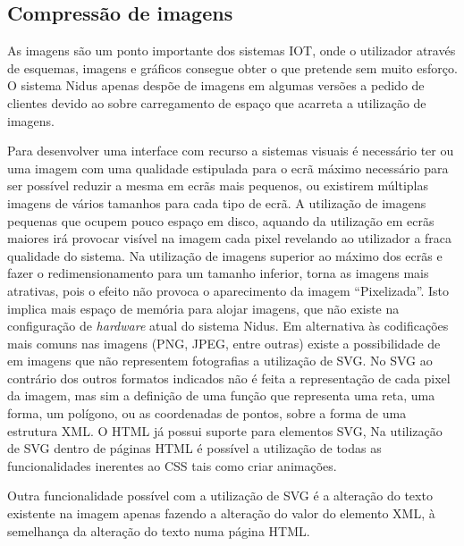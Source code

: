 \subsection{Compressão de imagens}\label{compressimaage}

\par As imagens são um ponto importante dos sistemas IOT, onde o utilizador através de esquemas, imagens e gráficos consegue obter o que pretende sem muito esforço. O sistema Nidus apenas despõe de imagens em algumas versões a pedido de clientes devido ao sobre carregamento de espaço que acarreta a utilização de imagens.
\par Para desenvolver uma interface com recurso a sistemas visuais é necessário ter ou uma imagem com uma qualidade estipulada para o ecrã máximo necessário para ser possível reduzir a mesma em ecrãs mais pequenos, ou existirem múltiplas imagens de vários tamanhos para cada tipo de ecrã. A utilização de imagens pequenas que ocupem pouco espaço em disco, aquando da utilização em ecrãs maiores irá provocar visível na imagem cada pixel revelando ao utilizador a fraca qualidade do sistema. Na utilização de imagens superior ao máximo dos ecrãs e fazer o redimensionamento para um tamanho inferior, torna as imagens mais atrativas, pois o efeito não provoca o aparecimento da imagem “Pixelizada”. Isto implica mais espaço de memória para alojar imagens, que não existe na configuração de \textit{hardware} atual do sistema Nidus. Em alternativa às codificações mais comuns nas imagens (PNG, JPEG, entre outras) existe a possibilidade de em imagens que não representem fotografias a utilização de SVG. No SVG ao contrário dos outros formatos indicados não é feita a representação de cada pixel da imagem, mas sim a definição de uma função que representa uma reta, uma forma, um polígono, ou as coordenadas de pontos, sobre a forma de uma estrutura XML. O HTML já possui suporte  para elementos SVG, Na utilização de SVG dentro de páginas HTML é possível a utilização de todas as funcionalidades inerentes ao CSS tais como criar animações. 
\par Outra funcionalidade possível com a utilização de SVG é a alteração do texto existente na imagem apenas fazendo a alteração do valor do elemento XML, à semelhança da alteração do texto numa página HTML.

